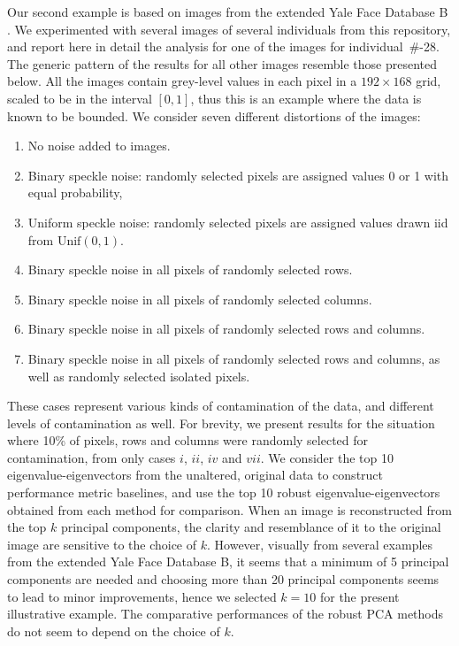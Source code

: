 \documentclass[ss]{imsart}
\theoremstyle{Example}
\begin{document}
Our second example is based on images from the extended Yale Face Database B \citep{ref:IEEEPAMI01643_PCA,ref:PAMI05684_PCA}. We experimented with several images of several individuals from this repository, and report here in detail the analysis for one of the images for individual~\#-28. The generic pattern of the results for all other images resemble those presented below. 
All the images contain grey-level values in each pixel in a $192 \times 168$ grid, scaled to be in the interval $[0, 1]$, thus this is an example where the data is known to be bounded. We consider seven different distortions of the images:
%
\begin{enumerate}[label=\roman*),leftmargin=*]
    \item No noise added to images.
    \item Binary speckle noise: randomly selected pixels are assigned values 0 or 1 with equal probability,
    \item Uniform speckle noise: randomly selected pixels are assigned values drawn iid from $\text{Unif}(0,1)$.
    \item Binary speckle noise in all pixels of randomly selected rows.
    \item Binary speckle noise in all pixels of randomly selected columns.
    \item Binary speckle noise in all pixels of randomly selected rows and columns.
    \item Binary speckle noise in all pixels of randomly selected rows and columns, as well as randomly selected isolated pixels.
\end{enumerate}
%
These cases represent various kinds of contamination of the data, and different levels of contamination as well. For brevity, we present results for the situation where 10\% of pixels, rows and columns were randomly selected for contamination, from only cases $i$, $ii$, $iv$ and $vii$. We consider the top 10 eigenvalue-eigenvectors from the unaltered, original data to construct performance metric baselines, and use the top 10 robust eigenvalue-eigenvectors obtained from each method for comparison. When an image is reconstructed from the top $k$ principal components, the clarity and resemblance of it to the original image are sensitive to the choice of $k$. However, visually from several examples from the extended Yale Face Database B, it seems that a minimum of 5 principal components are needed and choosing more than 20 principal components seems to lead to minor improvements, hence we selected $k =10$ for the present illustrative example. The comparative performances of the robust PCA methods do not seem to depend on the choice of $k$. 
\end{document}
